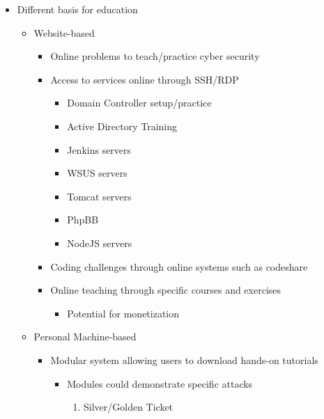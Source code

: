 \documentclass[openright]{report}
\begin{document}
\begin{appendices}
\begin{itemize}
    \item Different basis for education
    \begin{itemize}
        \item Website-based
            \begin{itemize}
                \item Online problems to teach/practice cyber security
                \item Access to services online through SSH/RDP
                    \begin{itemize}
                        \item Domain Controller setup/practice
                        \item Active Directory Training
                        \item Jenkins servers
                        \item WSUS servers
                        \item Tomcat servers
                        \item PhpBB
                        \item NodeJS servers
                    \end{itemize}
                \item Coding challenges through online systems such as codeshare
                \item Online teaching through specific courses and exercises
                    \begin{itemize}
                        \item Potential for monetization
                    \end{itemize}
            \end{itemize}
        \item Personal Machine-based
            \begin{itemize}
                \item Modular system allowing users to download hands-on tutorials 
                    \begin{itemize}
                        \item Modules could demonstrate specific attacks
                            \begin{adjustwidth}{2.5em}{0pt}
                                \begin{enumerate}
                                    \item Silver/Golden Ticket

\end{enumerate}
\end{adjustwidth}
\end{itemize}
\end{itemize}
\end{itemize}
\end{itemize}
\end{appendices}
\end{document}
